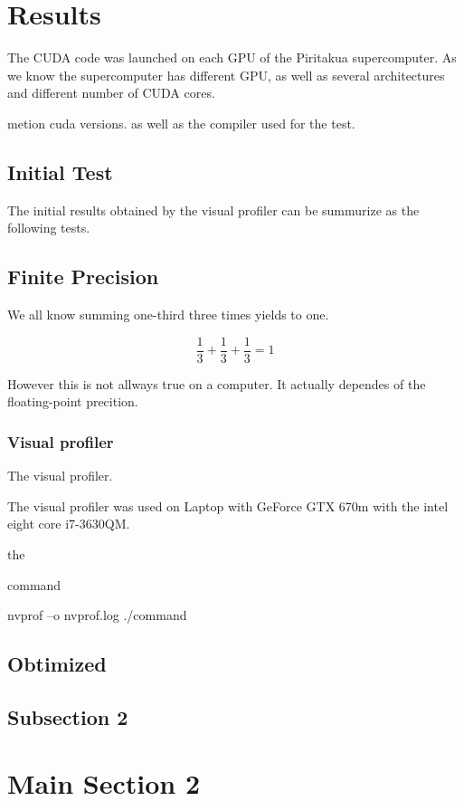 \section{Results}

The CUDA code was launched on each GPU of the Piritakua supercomputer. As we know the supercomputer has different GPU, as well as several architectures and different number of CUDA cores.


metion cuda versions. as well as the compiler used for the test.


\subsection{Initial Test}

The initial results obtained by the visual profiler can be summurize as the following tests.



\subsection{Finite Precision}

We all know summing one-third three times yields to one.

$$\dfrac{1}{3} + \dfrac{1}{3} + \dfrac{1}{3} = 1$$

 However this is not allways true on a computer. It actually dependes of the floating-point precition. 


\subsubsection{Visual profiler}

The visual profiler.

The visual profiler was used on Laptop with GeForce GTX 670m with the intel eight core i7-3630QM.


the

command

 nvprof –o nvprof.log ./command


\subsection{Obtimized}



\subsection{Subsection 2}


\section{Main Section 2}
